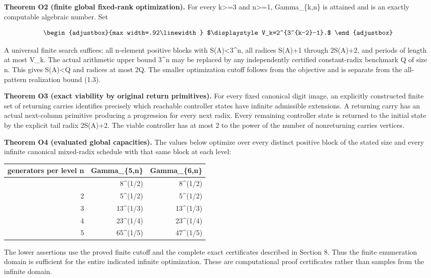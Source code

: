 \textbf{Theorem O2 (finite global fixed-rank optimization).} For every k\textgreater=3 and n\textgreater=1, Gamma\_\{k,n\} is attained and is an exactly computable algebraic number. Set

\[
\begin{adjustbox}{max width=.92\linewidth}
$\displaystyle V_k=2^{3^{k-2}-1}.$
\end{adjustbox}
\]

A universal finite search suffices: all n-element positive blocks with S(A)\textless3\^{}n, all radices S(A)+1 through 2S(A)+2, and periods of length at most V\_k. The actual arithmetic upper bound 3\^{}n may be replaced by any independently certified constant-radix benchmark Q of size n. This gives S(A)\textless Q and radices at most 2Q. The smaller optimization cutoff follows from the objective and is separate from the all-pattern realization bound (1.3).

\textbf{Theorem O3 (exact viability by original return primitives).} For every fixed canonical digit image, an explicitly constructed finite set of returning carries identifies precisely which reachable controller states have infinite admissible extensions. A returning carry has an actual next-column primitive producing a progression for every next radix. Every remaining controller state is returned to the initial state by the explicit tail radix 2S(A)+2. The viable controller has at most 2 to the power of the number of nonreturning carries vertices.

\textbf{Theorem O4 (evaluated global capacities).} The values below optimize over every distinct positive block of the stated size and every infinite canonical mixed-radix schedule with that same block at each level:

\begin{longtable}[]{@{}rrr@{}}
\toprule\noalign{}
generators per level n & Gamma\_\{5,n\} & Gamma\_\{6,n\} \\
\midrule\noalign{}
\endhead
\bottomrule\noalign{}
\endlastfoot
1 & 8\^{}(1/2) & 8\^{}(1/2) \\
2 & 5\^{}(1/2) & 5\^{}(1/2) \\
3 & 13\^{}(1/3) & 13\^{}(1/3) \\
4 & 23\^{}(1/4) & 23\^{}(1/4) \\
5 & 65\^{}(1/5) & 47\^{}(1/5) \\
\end{longtable}

The lower assertions use the proved finite cutoff and the complete exact certificates described in Section 8. Thus the finite enumeration domain is sufficient for the entire indicated infinite optimization. These are computational proof certificates rather than samples from the infinite domain.

